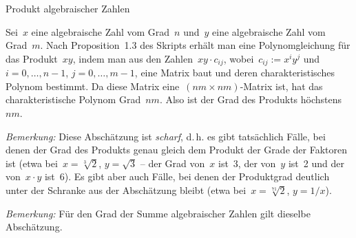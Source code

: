 \documentclass{algblatt}
\begin{document}
\begin{aufgabe}{Produkt algebraischer Zahlen}
\begin{loesungE}
\item Sei~$x$ eine algebraische Zahl vom Grad~$n$ und~$y$ eine algebraische
Zahl vom Grad~$m$. Nach Proposition~1.3 des Skripts erhält man eine
Polynomgleichung für das Produkt~$xy$, indem man aus den Zahlen~$xy \cdot
c_{ij}$, wobei~$c_{ij} := x^i y^j$ und~$i = 0,\ldots,n-1$, $j = 0,\ldots,m-1$,
eine Matrix baut und deren charakteristisches Polynom bestimmt. Da diese Matrix
eine~$(nm \times nm)$-Matrix ist, hat das charakteristische Polynom Grad~$nm$.
Also ist der Grad des Produkts höchstens~$nm$.

\emph{Bemerkung:} Diese Abschätzung ist \emph{scharf}, d.\,h. es gibt
tatsächlich Fälle, bei denen der Grad des Produkts genau gleich dem Produkt der
Grade der Faktoren ist (etwa bei~$x = \sqrt[3]{2}$, $y = \sqrt{3}$ -- der Grad
von~$x$ ist~3, der von~$y$ ist~2 und der von~$x \cdot y$ ist~6). Es gibt aber
auch Fälle, bei denen der Produktgrad deutlich unter der Schranke aus der
Abschätzung bleibt (etwa bei~$x = \sqrt[71]{2}$, $y = 1/x$).

\emph{Bemerkung:} Für den Grad der Summe algebraischer Zahlen gilt dieselbe
Abschätzung.
\end{loesungE}
\end{aufgabe}
\end{document}
